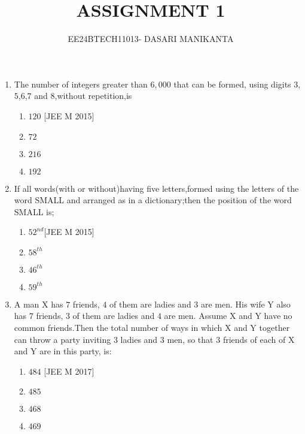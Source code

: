 \documentclass[journal,12pt,twocolumn]{IEEEtran}
\theoremstyle{remark}
\begin{document}



\title{ASSIGNMENT 1}
\author{EE24BTECH11013- DASARI MANIKANTA}
\maketitle
\newpage
\bigskip

\renewcommand{\thefigure}{\theenumi}
\renewcommand{\thetable}{\theenumi}



  \begin{enumerate}
  
	 	 \item The number of integers greater than $6,000$ that can be formed, using digits $3$,$5$,$6$,$7$ and $8$,without repetition,is

    \begin{enumerate}
    \item $120$ \hfill[JEE M 2015]
    \item $72$
    \item $216$
    \item $192$ 
    \end{enumerate} 
    
	    \item If all words(with or without)having five letters,formed using the letters of the word SMALL and arranged as in a dictionary;then the position of the word SMALL is; 
        
\begin{enumerate}
    \item $ 52^{nd} $\hfill[JEE M 2015]
    \item $ 58^{th} $
    \item $ 46^{th} $
    \item $ 59^{th} $
    \end{enumerate} 
 
	 \item A man X has $7$ friends, $4$ of them are ladies and $3$ are men. His wife Y also has $7$ friends, $3$ of them are ladies and $4$ are men. Assume X and Y have no common friends.Then the total number of ways in which X and Y together can throw a party inviting $3$ ladies and $3$ men, so that $3$ friends of each of X and Y are in this party, is: 
     
\begin{enumerate}
\item $484$ \hfill[JEE M 2017]
\item $485$
\item $468$
\item $469$
\end{enumerate}


\end{enumerate}
\end{document}
